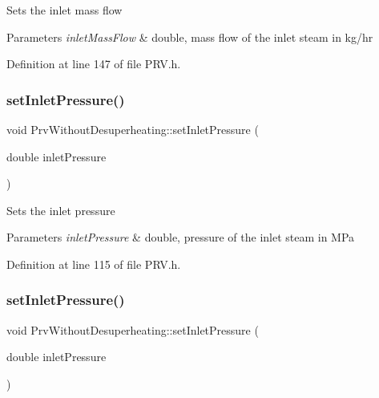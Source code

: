 Sets the inlet mass flow


\begin{DoxyParams}{Parameters}
{\em inlet\+Mass\+Flow} & double, mass flow of the inlet steam in kg/hr \\
\hline
\end{DoxyParams}


Definition at line 147 of file P\+R\+V.\+h.

\mbox{\label{class_prv_without_desuperheating_a26039a0a228ca66f96e8402bf741b9d9}} 
\subsubsection{\texorpdfstring{set\+Inlet\+Pressure()}{setInletPressure()}\hspace{0.1cm}{\footnotesize\ttfamily [1/3]}}
{\footnotesize\ttfamily void Prv\+Without\+Desuperheating\+::set\+Inlet\+Pressure (\begin{DoxyParamCaption}\item[{double}]{inlet\+Pressure }\end{DoxyParamCaption})\hspace{0.3cm}{\ttfamily [inline]}}

Sets the inlet pressure


\begin{DoxyParams}{Parameters}
{\em inlet\+Pressure} & double, pressure of the inlet steam in M\+Pa \\
\hline
\end{DoxyParams}


Definition at line 115 of file P\+R\+V.\+h.

\mbox{\label{class_prv_without_desuperheating_a26039a0a228ca66f96e8402bf741b9d9}} 
\subsubsection{\texorpdfstring{set\+Inlet\+Pressure()}{setInletPressure()}\hspace{0.1cm}{\footnotesize\ttfamily [2/3]}}
{\footnotesize\ttfamily void Prv\+Without\+Desuperheating\+::set\+Inlet\+Pressure (\begin{DoxyParamCaption}\item[{double}]{inlet\+Pressure }\end{DoxyParamCaption})\hspace{0.3cm}{\ttfamily [inline]}}

